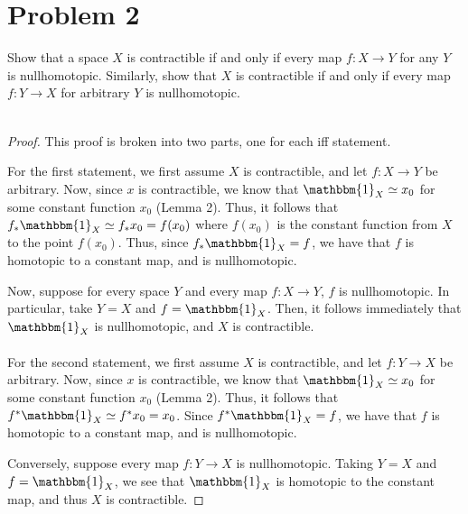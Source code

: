 \documentclass[fontsize=11pt]{scrartcl} %
\numberwithin{equation}{section} %
\numberwithin{figure}{section} %
\numberwithin{table}{section} %
\begin{document}
\section*{Problem 2} %
Show that a space $X$ is contractible if and only if every map $f:X\to Y$ for
any $Y$ is nullhomotopic. Similarly, show that $X$ is contractible if and only
if every map $f:Y\to X$ for arbitrary $Y$ is nullhomotopic.
\\
\\
\begin{proof}
    This proof is broken into two parts, one for each iff statement.

    For the first statement, we first assume $X$ is contractible, and let
    $f:X\to Y$ be arbitrary. Now, since $x$ is contractible, we know that
    $\mathbbm{1}_X\simeq x_0$ for some constant function $x_0$ (Lemma 2). 
    Thus, it follows that $f_*\mathbbm{1}_X\simeq f_*x_0 = f(x_0)$ where
    $f(x_0)$ is the constant function from $X$ to the point $f(x_0)$. Thus,
    since $f_*\mathbbm{1}_X = f$, we have that $f$ is homotopic to a constant
    map, and is nullhomotopic.

    Now, suppose for every space $Y$ and every map $f:X\to Y$, $f$ is
    nullhomotopic. In particular, take $Y=X$ and $f=\mathbbm{1}_X$. Then, it
    follows immediately that $\mathbbm{1}_X$ is nullhomotopic, and $X$ is
    contractible.
    \\
    \\
    For the second statement, we first assume $X$ is contractible, and let
    $f:Y\to X$ be arbitrary. Now, since $x$ is contractible, we know that
    $\mathbbm{1}_X\simeq x_0$ for some constant function $x_0$ (Lemma 2). 
    Thus, it follows that $f^*\mathbbm{1}_X\simeq f^*x_0 = x_0$.
    Since $f^*\mathbbm{1}_X = f$, we have that $f$ is homotopic to a constant
    map, and is nullhomotopic.

    Conversely, suppose every map $f:Y\to X$ is nullhomotopic. Taking $Y=X$ and
    $f = \mathbbm{1}_X$, we see that $\mathbbm{1}_X$ is homotopic to the
    constant map, and thus $X$ is contractible.
\end{proof}
\end{document}
